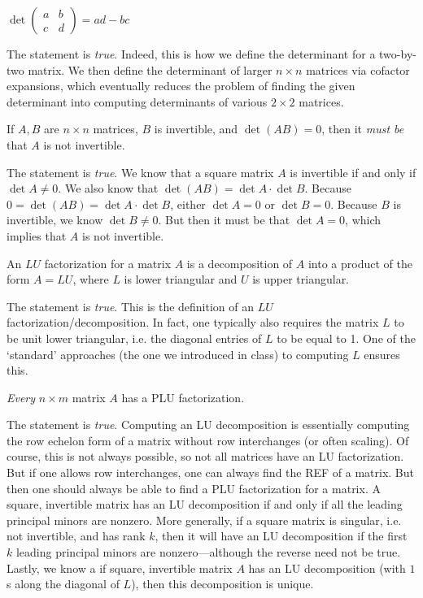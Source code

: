 \documentclass[11pt,letterpaper]{article}
\begin{document}
 $\det \begin{pmatrix} a & b \\ c & d \end{pmatrix}= ad - bc$ \pspace

\sol The statement is \textit{true}. Indeed, this is how we define the determinant for a two-by-two matrix. We then define the determinant of larger $n \times n$ matrices via cofactor expansions, which eventually reduces the problem of finding the given determinant into computing determinants of various $2 \times 2$ matrices. \pvspace{1.3cm}



 If $A,B$ are $n \times n$ matrices, $B$ is invertible, and $\det(AB)= 0$, then it \textit{must be} that $A$ is not invertible. \pspace

\sol The statement is \textit{true}. We know that a square matrix $A$ is invertible if and only if $\det A \neq 0$. We also know that $\det(AB)= \det A \cdot \det B$. Because $0= \det(AB)= \det A \cdot \det B$, either $\det A= 0$ or $\det B= 0$. Because $B$ is invertible, we know $\det B \neq 0$. But then it must be that $\det A= 0$, which implies that $A$ is not invertible. \pvspace{1.3cm}



 An $LU$ factorization for a matrix $A$ is a decomposition of $A$ into a product of the form $A= LU$, where $L$ is lower triangular and $U$ is upper triangular. \pspace

\sol The statement is \textit{true}. This is the definition of an $LU$ factorization/decomposition. In fact, one typically also requires the matrix $L$ to be unit lower triangular, i.e. the diagonal entries of $L$ to be equal to 1. One of the `standard' approaches (the one we introduced in class) to computing $L$ ensures this. \pvspace{1.3cm}



 \textit{Every} $n \times m$ matrix $A$ has a PLU factorization. \pspace

\sol The statement is \textit{true}. Computing an LU decomposition is essentially computing the row echelon form of a matrix without row interchanges (or often scaling). Of course, this is not always possible, so not all matrices have an LU factorization. But if one allows row interchanges, one can always find the REF of a matrix. But then one should always be able to find a PLU factorization for a matrix. A square, invertible matrix has an LU decomposition if and only if all the leading principal minors are nonzero. More generally, if a square matrix is singular, i.e. not invertible, and has rank $k$, then it will have an LU decomposition if the first $k$ leading principal minors are nonzero---although the reverse need not be true. Lastly, we know a if square, invertible matrix $A$ has an LU decomposition (with $1$s along the diagonal of $L$), then this decomposition is unique. \pvspace{1.3cm}
\end{document}
